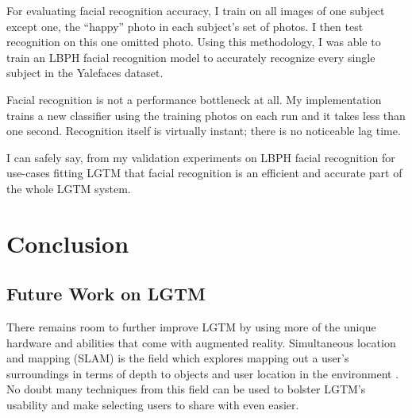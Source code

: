 \documentclass[12pt]{report}
\begin{document}
For evaluating facial recognition accuracy, I train on all images of one subject except one, the ``happy'' photo in each subject's set of photos. I then test recognition on this one omitted photo. Using this methodology, I was able to train an LBPH facial recognition model to accurately recognize every single subject in the Yalefaces dataset. \par

Facial recognition is not a performance bottleneck at all. My implementation trains a new classifier using the training photos on each run and it takes less than one second. Recognition itself is virtually instant; there is no noticeable lag time. \par

I can safely say, from my validation experiments on LBPH facial recognition for use-cases fitting LGTM that facial recognition is an efficient and accurate part of the whole LGTM system. \par



\chapter{Conclusion}
\section{Future Work on LGTM}
There remains room to further improve LGTM by using more of the unique hardware and abilities that come with augmented reality. Simultaneous location and mapping (SLAM) is the field which explores mapping out a user's surroundings in terms of depth to objects and user location in the environment \cite{ParallelTrackingAndMappingKlein2007,MonoSlamDavison2007,VisualIntertialOdometryNonlinearLeutenegger2014,ProjectTangoWebsite,SlamPart1Durrant-Whyte2006}. No doubt many techniques from this field can be used to bolster LGTM's usability and make selecting users to share with even easier. \par
\end{document}
